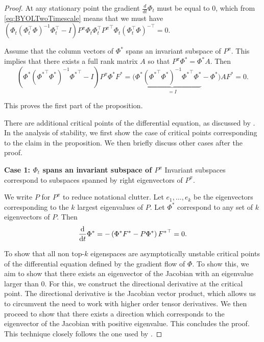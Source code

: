\begin{proof}
    At any stationary point the gradient $\frac{d}{dt}\Phi_t$ must be equal to $0$, which from \cref{eq:BYOLTwoTimescale} means that we must have $\left(\Phi_t\left(\Phi^\top_t \Phi\right)^{-1}\Phi_t^\top - I\right)P^\pi\Phi_t \Phi_t^\top {P^\pi}^\top \Phi_t\left(\Phi^\top_t \Phi\right)^{-\top}=0$.

    Assume that the column vectors of $\Phi^*$ spans an invariant subspace of $P^\pi$. This implies that there exists a full rank matrix $A$ so that $P^\pi \Phi^* = \Phi^*A$.
    Then 
    $$\left(\Phi^*\left({\Phi^*}^\top \Phi^*\right)^{-1}{\Phi^*}^\top - I\right)P^\pi\Phi^* F^*=\Big(\Phi^*\underbrace{\left({\Phi^*}^\top \Phi^*\right)^{-1}{\Phi^*}^\top\Phi^*}_{=I} - \Phi^*\Big)A F^*=0.$$

This proves the first part of the proposition.

There are additional critical points of the differential equation, as discussed by \cite{tang2022understanding}.
In the analysis of stability, we first show the case of critical points corresponding to the claim in the proposition.
We then briefly discuss other cases after the proof.

\textbf{Case 1: $\Phi_t$ spans an invariant subspace of $P^\pi$}
Invariant subspaces correspond to subspaces spanned by right eigenvectors of $P^\pi$.

We write $P$ for $P^\pi$ to reduce notational clutter.
Let $e_1,\dots,e_k$ be the eigenvectors corresponding to the $k$ largest eigenvalues of $P$.
Let $\Phi^*$ correspond to any set of $k$ eigenvectors of $P$. Then
\begin{align*}
    \frac{\mathrm{d}}{\mathrm{d} t}\Phi^* = -\left(\Phi^* F^* - P \Phi^*\right) {F^*}^\top = 0.
\end{align*}

To show that all non top-$k$ eigenspaces are asymptotically unstable critical points of the differential equation defined by the gradient flow of $\Phi$.
To show this, we aim to show that there exists an eigenvector of the Jacobian with an eigenvalue larger than $0$.
For this, we construct the directional derivative at the critical point.
The directional derivative is the Jacobian vector product, which allows us to circumvent the need to work with higher order tensor derivatives.
We then proceed to show that there exists a direction which corresponds to the eigenvector of the Jacobian with positive eigenvalue.
This concludes the proof.
This technique closely follows the one used by \cite{lelan2023bootstrapped}.


\end{proof}
